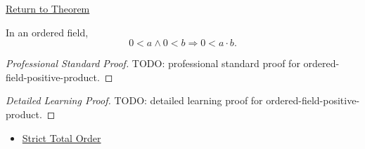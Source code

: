\newpage
{}
\label{prf:ordered-field-positive-product}

\begin{remark*}[Return]
\hyperref[thm:ordered-field-positive-product]{Return to Theorem}
\end{remark*}

\begin{theorem*}
In an ordered field,
\[
0<a\land0<b
\Longrightarrow
0<a\cdot b.
\]
\end{theorem*}

\begin{proof}[Professional Standard Proof]
\LRAProofBodyStart
TODO: professional standard proof for ordered-field-positive-product.
\end{proof}

\begin{proof}[Detailed Learning Proof]
\LRAProofBodyStart
TODO: detailed learning proof for ordered-field-positive-product.
\end{proof}

\begin{remark*}
\end{remark*}

\begin{dependencies}
\begin{itemize}
  \item \hyperref[def:strict-total-order]{Strict Total Order}
\end{itemize}
\end{dependencies}

\clearpage

